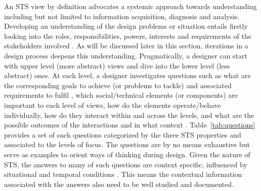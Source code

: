 An STS view by definition advocates a systemic approach towards understanding including but not limited to information acquisition, diagnosis and analysis. Developing an understanding of the design problems or situation entails firstly looking into the roles, responsibilities, powers, interests and requirements of the stakeholders involved \cite{Checkland1981}. As will be discussed later in this section, iterations in a design process deepens this understanding. 
Pragmatically, a designer can start with upper level (more abstract) views and dive into the lower level (less abstract) ones. %
At each level, a designer investigates questions such as what are the corresponding goals to achieve (or problems to tackle) \cite{Checkland1981,Waterson2002} and associated requirements to fulfil \cite{Whitworth2009a}, which social/technical elements (or components) are important to each level of views, how do the elements operate/behave individually, how do they interact within and across the levels, and what are the possible outcomes of the interactions and in what context \cite{Baxter2011}. 
%
Table~\ref{tab:questions} provides a set of such questions categorized by the three STS properties and associated to the levels of focus. The questions are by no means exhaustive but serve as examples to orient ways of thinking during design. 
Given the nature of STS, the answers to many of such questions are context specific, influenced by situational and temporal conditions \cite{Baxter2011,Norman2015}. This means the contextual information associated with the answers also need to be well studied and documented. 
% 
